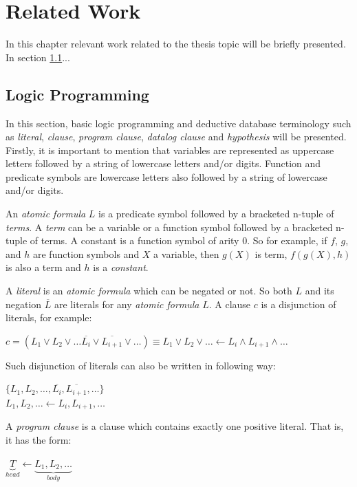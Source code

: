\chapter{Related Work}
\label{rw:intro}

In this chapter relevant work related to the thesis topic will be briefly presented. In section
\ref{rw:logicProgramming}...


\section{Logic Programming}
\label{rw:logicProgramming}

\cite{DBLP:books/sp/Lloyd87}
\cite{DBLP:journals/ml/LavracD96}
In this section, basic logic programming and deductive database terminology such as \emph{literal}, \emph{clause},
\emph{program clause}, \emph{datalog clause} and \emph{hypothesis} will be presented. Firstly, it is important to
mention that variables are represented as uppercase letters followed by a string of lowercase letters and/or digits.
Function and predicate symbols are lowercase letters also followed by a string of lowercase and/or digits.

An \emph{atomic formula} $L$ is a predicate symbol followed by a bracketed n-tuple of \emph{terms}. A \emph{term} can be
a variable or a function symbol followed by a bracketed n-tuple of terms. A constant is a function symbol of arity 0. So
for example, if $f$, $g$, and $h$ are function symbols and $X$ a variable, then $g(X)$ is term, $f(g(X),h)$ is also a
term and $h$ is a \emph{constant}.

A \emph{literal} is an \emph{atomic formula} which can be negated or not. So both $L$ and its negation $\overline{L}$
are literals for any \emph{atomic formula} $L$. A clause $c$ is a disjunction of literals, for example:
\begin{center}
  $c=(L_1 \vee L_2 \vee \ldots \overline{L_{i}} \vee \overline{L_{i+1}} \vee \ldots) \equiv
 L_1 \vee L_2 \vee \ldots \leftarrow L_i \wedge L_{i+1} \wedge \ldots$
\end{center}

Such disjunction of literals can also be written in following way:
\begin{center}
 $\{L_1,L_2,\ldots,\overline{L_i},\overline{L_{i+1}},\ldots\}$ \\
$ L_1,L_2,\ldots \leftarrow L_i,L_{i+1},\ldots$
\end{center}

A \emph{program clause} is a clause which contains exactly one positive literal. That is, it has the form:
\begin{center}
 $\underbrace{T}_{head} \leftarrow \underbrace{L_1,L_2,\ldots}_{body}$
\end{center}

